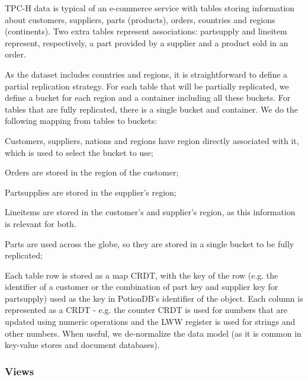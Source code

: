 \documentclass[sigplan,twocolumn,review,anonymous]{acmart}
\begin{document}
TPC-H data is typical of an e-commerce service with tables storing information about customers, suppliers, parts (products), orders, 
countries and regions (continents).
Two extra tables represent associations: partsupply and lineitem represent, respectively, a part provided by a supplier
and a product sold in an order. 

As the dataset includes countries and regions, it is straightforward to define a partial replication strategy. 
For each table that will be partially replicated, we define a bucket for each region and a container including all these buckets.
For tables that are fully replicated, there is a single bucket and container. 
We do the following mapping from tables to buckets: 
\begin{inparaenum}[(i)]
\item Customers, suppliers, nations and regions have 
region directly
associated with it, which is used to select the bucket to use;
\item Orders are stored in the region of the customer;
\item Partsupplies are stored in the supplier's region;
\item Lineitems are stored in the customer's and supplier's region, as this information is relevant for both.
\item Parts are used across the globe, so they are stored in a single bucket to be fully replicated;
\end{inparaenum}

Each table row is stored as a map CRDT, with the key of the row (e.g. the identifier of a customer or the combination of part key and supplier key for partsupply) used as the key in PotionDB's identifier of the object. 
Each column is represented as a CRDT - e.g. the counter CRDT is used for numbers that are updated using numeric operations and the
LWW register is used for strings and other numbers.
When useful, we de-normalize the data model (as it is common in key-value stores and document databases). 

\subsubsection{Views}
\label{subsec:views_for_queries}
\end{document}

